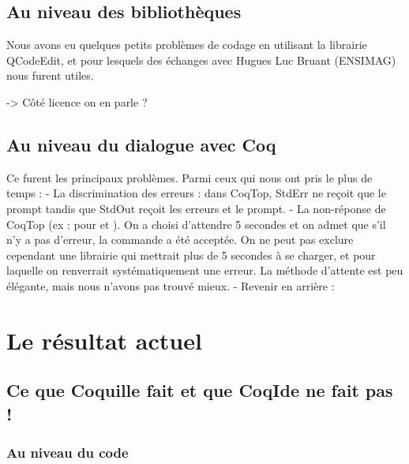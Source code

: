     \subsection{Au niveau des bibliothèques}
    
        Nous avons eu quelques petits problèmes de codage en utilisant la librairie QCodeEdit, et pour lesquels des échanges avec Hugues Luc Bruant (ENSIMAG) nous furent utiles.
		
		
		-> Côté licence on en parle ?
		
    \subsection{Au niveau du dialogue avec Coq}
    
        Ce furent les principaux problèmes. Parmi ceux qui nous ont pris le plus de temps :
        - La discrimination des erreurs : dans CoqTop, StdErr ne reçoit que le prompt tandis que StdOut reçoit les erreurs et le prompt. 
        - La non-réponse de CoqTop (ex : pour  et ). On a choisi d'attendre 5 secondes et on admet que s'il n'y a pas d'erreur, la commande a été acceptée. On ne peut pas exclure cependant une librairie qui mettrait plus de 5 secondes à se charger, et pour laquelle on renverrait systématiquement une erreur. La méthode d'attente est peu élégante, mais nous n'avons pas trouvé mieux.
        - Revenir en arrière : 
		
				
\section{Le résultat actuel}

    \subsection{Ce que Coquille fait et que CoqIde ne fait pas !}
    
        \subsubsection{Au niveau du code}
        
